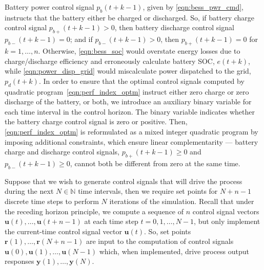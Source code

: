\documentclass[conference]{IEEEtran}
\def\N{\mathbb{N}}
\begin{document}
Battery power control signal $p_{b}(t\!+\!k\!-\!1)$, given by \eqref{eqn:bess_pwr_cmd}, instructs that the battery either be charged or discharged.  So, if battery charge control signal $p_{b+}(t\!+\!k\!-\!1)>0$, then battery discharge control signal $p_{b-}(t\!+\!k\!-\!1)=0$; and if $p_{b-}(t\!+\!k\!-\!1)>0$, then $p_{b+}(t\!+\!k\!-\!1)=0$ for $k = 1, \ldots, n$.  Otherwise, \eqref{eqn:bess_soc} would overstate energy losses due to charge/discharge efficiency and erroneously calculate battery SOC, ${e(t\!+\!k)}$, while \eqref{eqn:power_disp_grid} would miscalculate power dispatched to the grid, ${p_{d}(t\!+\!k)}$.  In order to ensure that the optimal control signals computed by quadratic program~\eqref{eqn:perf_index_optm} instruct either zero charge or zero discharge of the battery, or both, we introduce an auxiliary binary variable for each time interval in the control horizon.  The binary variable indicates whether the battery charge control signal is zero or positive.  Then, \eqref{eqn:perf_index_optm} is reformulated as a mixed integer quadratic program by imposing additional constraints, which ensure linear complementarity --- battery charge and discharge control signals, ${p_{b+}(t\!+\!k\!-\!1) \geq 0}$ and ${p_{b-}(t\!+\!k\!-\!1) \geq 0}$, cannot both be different from zero at the same time.

Suppose that we wish to generate control signals that will drive the process during the next $N\in\N$ time intervals, then we require set points for $N\!+\!n\!-\!1$ discrete time steps to perform $N$ iterations of the simulation.  Recall that under the receding horizon principle, we compute a sequence of $n$ control signal vectors ${\boldsymbol{u}(t), \ldots, \boldsymbol{u}(t\!+\!n\!-\!1)}$ at each time step ${t = 0, 1, \ldots, N\!-\!1}$, but only implement the current-time control signal vector $\boldsymbol{u}(t)$.  So, set points ${\boldsymbol{r}(1), \ldots, \boldsymbol{r}(N\!+\!n\!-\!1)}$ are input to the computation of control signals ${\boldsymbol{u}(0), \boldsymbol{u}(1), \ldots, \boldsymbol{u}(N\!-\!1)}$ which, when implemented, drive process output responses ${\boldsymbol{y}(1), \ldots, \boldsymbol{y}(N)}$.

\end{document}
